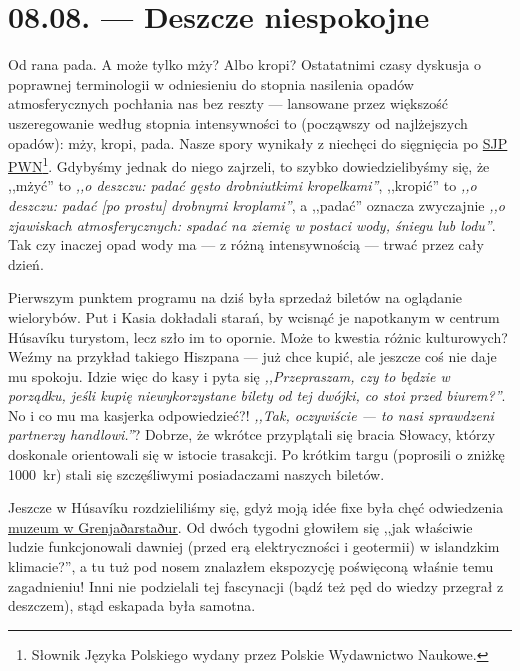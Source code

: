 \chapter*{08.08. --- Deszcze niespokojne\textellipsis}

Od rana pada. A może tylko mży? Albo kropi? Ostatatnimi czasy dyskusja o poprawnej terminologii w odniesieniu do stopnia nasilenia opadów atmosferycznych pochłania nas bez reszty --- lansowane przez większość uszeregowanie według stopnia intensywności to (począwszy od najlżejszych opadów): mży, kropi, pada. Nasze spory wynikały z niechęci do sięgnięcia po \href{http://sjp.pwn.pl/}{SJP PWN}\footnote{Słownik Języka Polskiego wydany przez Polskie Wydawnictwo Naukowe.}. Gdybyśmy jednak do niego zajrzeli, to szybko dowiedzielibyśmy się, że ,,mżyć'' to \emph{,,o deszczu: padać gęsto drobniutkimi kropelkami''}, ,,kropić'' to \emph{,,o deszczu: padać [po prostu] drobnymi kroplami''}, a ,,padać'' oznacza zwyczajnie \emph{,,o zjawiskach atmosferycznych: spadać na ziemię w postaci wody, śniegu lub lodu''}. Tak czy inaczej opad wody ma --- z różną intensywnością --- trwać przez cały dzień.

Pierwszym punktem programu na dziś była sprzedaż biletów na oglądanie wielorybów. Put i Kasia dokładali starań, by wcisnąć je napotkanym w centrum Húsavíku turystom, lecz szło im to opornie. Może to kwestia różnic kulturowych? Weźmy na przykład takiego Hiszpana --- już chce kupić, ale jeszcze coś nie daje mu spokoju. Idzie więc do kasy i pyta się \emph{,,Przepraszam, czy to będzie w porządku, jeśli kupię niewykorzystane bilety od tej dwójki, co stoi przed biurem?''}. No i co mu ma kasjerka odpowiedzieć?! \emph{,,Tak, oczywiście --- to nasi sprawdzeni partnerzy handlowi.''}? Dobrze, że wkrótce przyplątali się bracia Słowacy, którzy doskonale orientowali się w istocie trasakcji. Po krótkim targu (poprosili o zniżkę 1000~kr) stali się szczęśliwymi posiadaczami naszych biletów.


Jeszcze w Húsavíku rozdzieliliśmy się, gdyż moją idée fixe była chęć odwiedzenia \href{http://www.visithusavik.com/attractions/the-turf-house-museum/}{muzeum w Grenjaðarstaður}. Od dwóch tygodni głowiłem się ,,jak właściwie ludzie funkcjonowali dawniej (przed erą elektryczności i geotermii) w islandzkim klimacie?'', a tu tuż pod nosem znalazłem ekspozycję poświęconą właśnie temu zagadnieniu! Inni nie podzielali tej fascynacji (bądź też pęd do wiedzy przegrał z deszczem), stąd eskapada była samotna.


